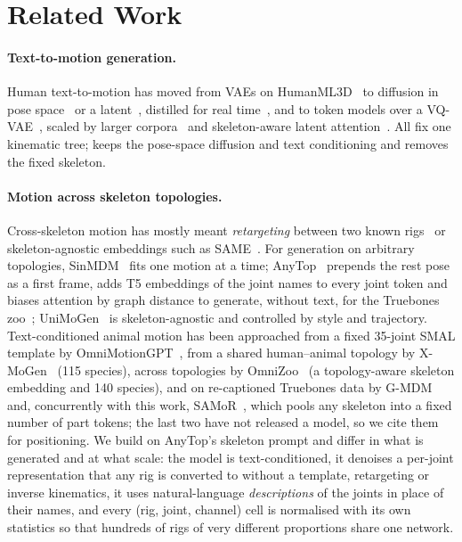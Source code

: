 \section{Related Work}\label{sec:related}

\paragraph{Text-to-motion generation.} Human text-to-motion has moved from VAEs on
HumanML3D~\citep{guo2022generating} to diffusion in pose space~\citep{tevet2023mdm,zhang2024motiondiffuse}
or a latent~\citep{chen2023mld}, distilled for real time~\citep{dai2024motionlcm}, and to token
models over a VQ-VAE~\citep{zhang2023t2mgpt,guo2024momask}, scaled by larger
corpora~\citep{lin2023motionx,fan2025motionmillion} and skeleton-aware latent
attention~\citep{hong2025salad}. All fix one kinematic tree; \method{} keeps the pose-space
diffusion and text conditioning and removes the fixed skeleton.

\paragraph{Motion across skeleton topologies.} Cross-skeleton motion has mostly meant
\emph{retargeting} between two known rigs~\citep{villegas2018nkn,aberman2020skeleton} or
skeleton-agnostic embeddings such as SAME~\citep{lee2023same}. For generation on arbitrary
topologies, SinMDM~\citep{raab2024sinmdm} fits one motion at a time; AnyTop~\citep{gat2025anytop}
prepends the rest pose as a first frame, adds T5 embeddings of the joint names to every joint token
and biases attention by graph distance to generate, without text, for the Truebones
zoo~\citep{truebones}; UniMoGen~\citep{khani2025unimogen} is skeleton-agnostic and controlled by
style and trajectory. Text-conditioned animal motion has been approached from a fixed 35-joint
SMAL template by OmniMotionGPT~\citep{yang2024omnimotiongpt}, from a shared human--animal topology
by X-MoGen~\citep{wang2025xmogen} (115 species), across topologies by OmniZoo~\citep{chen2025omnizoo}
(a topology-aware skeleton embedding and 140 species), and on re-captioned Truebones data by
G-MDM~\citep{lee2025dragon} and, concurrently with this work, SAMoR~\citep{samor2026}, which pools
any skeleton into a fixed number of part tokens; the last two have not released a model, so we cite
them for positioning. We build on AnyTop's skeleton prompt and differ in what is generated and at
what scale: the model is text-conditioned, it denoises a per-joint representation that any rig is
converted to without a template, retargeting or inverse kinematics, it uses natural-language
\emph{descriptions} of the joints in place of their names, and every (rig, joint, channel) cell is
normalised with its own statistics so that hundreds of rigs of very different proportions share one
network.

